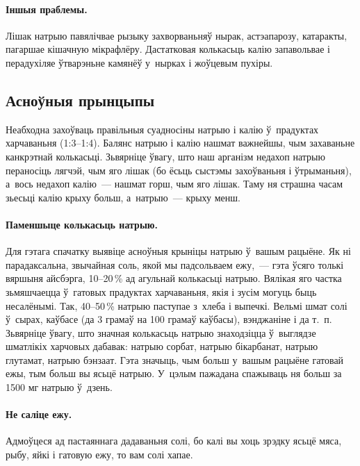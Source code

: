 \paragraph{Іншыя праблемы.}
Лішак натрыю павялічвае рызыку захворваньняў нырак, астэапарозу, катаракты, пагаршае кішачную мікрафлёру. Дастатковая колькасьць калію запавольвае і перадухіляе ўтварэньне камянёў у~нырках і жоўцевым пухіры.

\subsection{Асноўныя прынцыпы}

Неабходна захоўваць правільныя суадносіны натрыю і калію ў~прадуктах харчаваньня (1:3--1:4). Балянс натрыю і калію нашмат важнейшы, чым захаваньне канкрэтнай колькасьці. Зьвярніце ўвагу, што наш арганізм недахоп натрыю пераносіць лягчэй, чым яго лішак (бо ёсьць сыстэмы захоўваньня і ўтрыманьня), а~вось недахоп калію~--- нашмат горш, чым яго лішак. Таму ня страшна часам зьесьці калію крыху больш, а~натрыю~--- крыху менш.


\paragraph{Паменшыце колькасьць натрыю.}
Для гэтага спачатку выявіце асноўныя крыніцы натрыю ў~вашым рацыёне. Як ні парадаксальна, звычайная соль, якой мы падсольваем ежу,~--- гэта ўсяго толькі вяршыня айсбэрга, 10–20\,\% ад агульнай колькасьці натрыю. Вялікая яго частка зьмяшчаецца ў~гатовых прадуктах харчаваньня, якія і зусім могуць быць несалёнымі. Так, 40--50\,\% натрыю паступае з~хлеба і выпечкі. Вельмі шмат солі ў~сырах, каўбасе (да 3 грамаў на 100 грамаў каўбасы), вэнджаніне і да т.~п. Зьвярніце ўвагу, што значная колькасьць натрыю знаходзіцца ў~выглядзе шматлікіх харчовых дабавак: натрыю сорбат, натрыю бікарбанат, натрыю глутамат, натрыю бэнзаат. Гэта значыць, чым больш у~вашым рацыёне гатовай ежы, тым больш вы ясьцё натрыю. У~цэлым пажадана спажываць ня больш за 1500 мг натрыю ў~дзень.

\paragraph{Не саліце ежу.}
Адмоўцеся ад пастаяннага дадаваньня солі, бо калі вы хоць зрэдку ясьцё мяса, рыбу, яйкі і гатовую ежу, то вам солі хапае.

